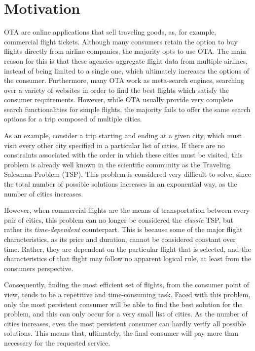 \section{Motivation}

\ac{OTA} are online applications that sell traveling goods, as, for example, commercial flight tickets. Although many consumers retain the option to buy flights directly from airline companies, the majority opts to use OTA. The main reason for this is that these agencies aggregate flight data from multiple airlines, instead of being limited to a single one, which ultimately increases the options of the consumer. Furthermore, many OTA work as meta-search engines, searching over a variety of websites in order to find the best flights which satisfy the consumer requirements. However, while OTA usually provide very complete search functionalities for simple flights, the majority fails to offer the same search options for a trip composed of multiple cities. 

As an example, consider a trip starting and ending at a given city, which must visit every other city specified in a particular list of cities. If there are no constraints associated with the order in which these cities must be visited, this problem is already well known in the scientific community as the Traveling Salesman Problem (TSP). This problem is considered very difficult to solve, since the total number  of possible solutions increases in an exponential way, as the number of cities increases.

However, when commercial flights are the means of transportation between every pair of cities, this problem can no longer be considered the \textit{classic} \ac{TSP}, but rather its \textit{time-dependent} counterpart. This is because some of the major flight characteristics, as its price and duration, cannot be considered constant over time. Rather, they are dependent on the particular flight that is selected, and the characteristics of that flight may follow no apparent logical rule, at least from the consumers perspective.

Consequently, finding the most efficient set of flights, from the consumer point of view, tends to be a repetitive and time-consuming task. Faced with this problem, only the most persistent consumer will be able to find the best solution for the problem, and this can only  occur for a very small list of cities. As the number of cities increases, even the most persistent consumer can hardly verify all possible solutions. This means that, ultimately, the final consumer will pay more than necessary for the requested service.

